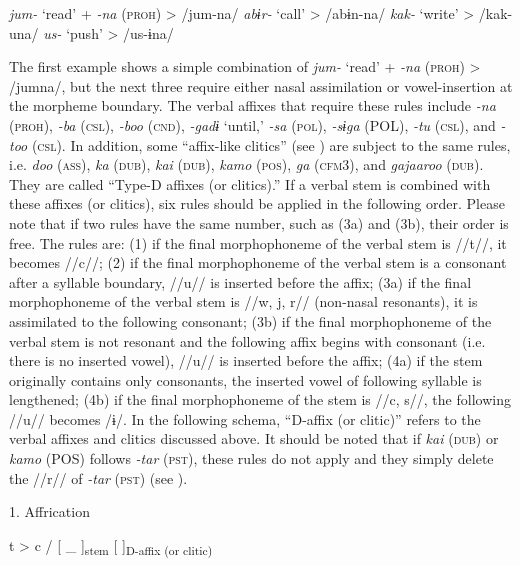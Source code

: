 \ea\label{ex:8-16}
    \ea \textit{jum-}  ‘read’  +  \textit{-na} (\textsc{proh})  >  /jum-na/
    \ex \textit{abɨr-}  ‘call’        >  /abɨn-na/
    \ex \textit{kak-}  ‘write’        >  /kak-una/
    \ex \textit{us-}  ‘push’        >  /us-ɨna/
    \z
\z

The first example shows a simple combination of \textit{jum-} ‘read’ + \textit{-na} (\textsc{proh}) > /jumna/, but the next three require either nasal assimilation or vowel-insertion at the morpheme boundary. The verbal affixes that require these rules include \textit{-na} (\textsc{proh}), \textit{-ba} (\textsc{csl}), \textit{-boo} (\textsc{cnd}), \textit{-gadɨ} ‘until,’ \textit{-sa} (\textsc{pol}), \textit{-sɨga} (POL), \textit{-tu} (\textsc{csl}), and \textit{-too} (\textsc{csl}). In addition, some “affix-like clitics” (see ) are subject to the same rules, i.e. \textit{doo} (\textsc{ass}), \textit{ka} (\textsc{dub}), \textit{kai} (\textsc{dub}), \textit{kamo} (\textsc{pos}), \textit{ga} (\textsc{cfm3}), and \textit{gajaaroo} (\textsc{dub}). They are called “Type-D affixes (or clitics).” If a verbal stem is combined with these affixes (or clitics), six rules should be applied in the following order. Please note that if two rules have the same number, such as (3a) and (3b), their order is free. The rules are: (1) if the final morphophoneme of the verbal stem is //t//, it becomes //c//; (2) if the final morphophoneme of the verbal stem is a consonant after a syllable boundary, //u// is inserted before the affix; (3a) if the final morphophoneme of the verbal stem is //w, j, r// (non-nasal resonants), it is assimilated to the following consonant; (3b) if the final morphophoneme of the verbal stem is not resonant and the following affix begins with consonant (i.e. there is no inserted vowel), //u// is inserted before the affix; (4a) if the stem originally contains only consonants, the inserted vowel of following syllable is lengthened; (4b) if the final morphophoneme of the stem is //c, s//, the following //u// becomes /ɨ/. In the following schema, “D-affix (or clitic)” refers to the verbal affixes and clitics discussed above. It should be noted that if \textit{kai} (\textsc{dub}) or \textit{kamo} (POS) follows \textit{-tar} (\textsc{pst}), these rules do not apply and they simply delete the //r// of \textit{-tar} (\textsc{pst}) (see ).

\ea\label{ex:8-17}
  1.  Affrication

    t  >  c  /  [    \_ ]\textsubscript{stem}  [  ]\textsubscript{D-affix (or clitic)}

